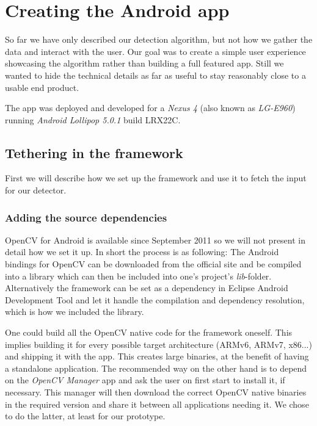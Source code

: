 
\chapter{Creating the Android app}
\label{android}
	So far we have only described our detection algorithm, but not how we gather the data and interact with the user. Our goal was to create a simple user experience showcasing the algorithm rather than building a full featured app. Still we wanted to hide the technical details as far as useful to stay reasonably close to a usable end product.

	The app was deployed and developed for a \textit{Nexus 4} (also known as \textit{LG-E960}) running \textit{Android Lollipop 5.0.1} build LRX22C.

	\section{Tethering in the framework}
	\label{android-framework}
	First we will describe how we set up the framework and use it to fetch the input for our detector.

	\subsection{Adding the source dependencies}
	\label{android-framework-dependencies}
	OpenCV for Android is available since September 2011 so we will not present in detail how we set it up. In short the process is as following: The Android bindings for OpenCV can be downloaded from the official site and be compiled into a library which can then be included into one's project's \textit{lib}-folder. Alternatively the framework can be set as a dependency in Eclipse Android Development Tool and let it handle the compilation and dependency resolution, which is how we included the library.

	One could build all the OpenCV native code for the framework oneself. This implies building it for every possible target architecture (ARMv6, ARMv7, x86...) and shipping it with the app. This creates large binaries, at the benefit of having a standalone application. The recommended way on the other hand is to depend on the \textit{OpenCV Manager} app and ask the user on first start to install it, if necessary. This manager will then download the correct OpenCV native binaries in the required version and share it between all applications needing it. We chose to do the latter, at least for our prototype.

